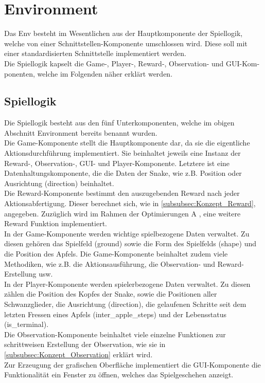 \section{Environment} \label{sec:Konzept_Environment}
Das Env besteht im Wesentlichen aus der Hauptkomponente der Spiellogik, welche von einer Schnittstellen-Komponente umschlossen wird. Diese soll mit einer standardisierten Schnittstelle  implementiert werden.\\
Die Spiellogik kapselt die Game-, Player-, Reward-, Observation- und GUI-Kom-ponenten, welche im Folgenden näher erklärt werden.

\subsection{Spiellogik} \label{subsec:Konzept_Spiellogik}
Die Spiellogik besteht aus den fünf Unterkomponenten, welche im obigen Abschnitt Environment bereits benannt wurden.\\
Die Game-Komponente stellt die Hauptkomponente dar, da sie die eigentliche Aktionsdurchführung implementiert. Sie beinhaltet jeweils eine Instanz der Reward-, Observation-, GUI- und Player-Komponente. Letztere ist eine Datenhaltungskomponente, die die Daten der Snake, wie z.B. Position oder Ausrichtung (direction) beinhaltet.\\
Die Reward-Komponente bestimmt den auszugebenden Reward nach jeder Aktionsabfertigung. Dieser berechnet sich, wie in \autoref{subsubsec:Konzept_Reward}, angegeben. Zuzüglich wird im Rahmen der Optimierungen A , eine weitere Reward Funktion implementiert.\\
In der Game-Komponente werden wichtige spielbezogene Daten verwaltet. Zu diesen gehören das Spielfeld (ground) sowie die Form des Spielfelds (shape) und die Position des Apfels. Die Game-Komponente beinhaltet zudem viele Methodiken, wie z.B. die Aktionsausführung, die Observation- und Reward-Erstellung usw.\\
In der Player-Komponente werden spielerbezogene Daten verwaltet. Zu diesen zählen die Position des Kopfes der Snake, sowie die Positionen aller Schwanzglieder, die Ausrichtung (direction), die gelaufenen Schritte seit dem letzten Fressen eines Apfels (inter\_apple\_steps) und der Lebensstatus (is\_terminal).\\
Die Observation-Komponente beinhaltet viele einzelne Funktionen zur schrittweisen Erstellung der Observation, wie sie in \autoref{subsubsec:Konzept_Observation} erklärt wird.\\
Zur Erzeugung der grafischen Oberfläche implementiert die GUI-Komponente die Funktionalität ein Fenster zu öffnen, welches das Spielgeschehen anzeigt.

